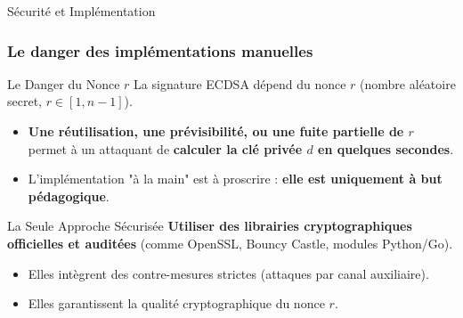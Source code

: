 \begin{frame}{Sécurité et Implémentation}
\frametitle{Le danger des implémentations manuelles}

\begin{block}{Le Danger du Nonce $r$}
La signature ECDSA dépend du nonce $r$ (nombre aléatoire secret, $r \in [1, n-1]$).

\begin{itemize}
    \item \textbf{Une réutilisation, une prévisibilité, ou une fuite partielle de $r$} permet à un attaquant de \textbf{calculer la clé privée $d$ en quelques secondes}.
    \item L'implémentation "à la main" est à proscrire : \textbf{elle est uniquement à but pédagogique}.
\end{itemize}
\end{block}

\begin{alertblock}{La Seule Approche Sécurisée}
\textbf{Utiliser des librairies cryptographiques officielles et auditées} (comme OpenSSL, Bouncy Castle, modules Python/Go).
\begin{itemize}
    \item Elles intègrent des contre-mesures strictes (attaques par canal auxiliaire).
    \item Elles garantissent la qualité cryptographique du nonce $r$.
\end{itemize}
\end{alertblock}
\end{frame}

